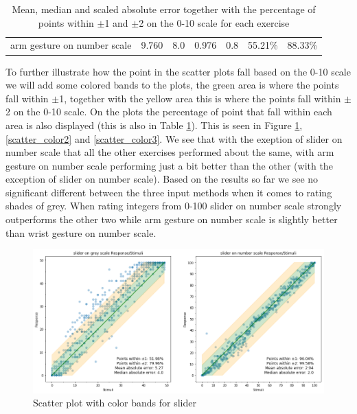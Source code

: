\begin{table}[p]
{\begin{tabular}{rcccccc}
\multicolumn{1}{r|}{arm gesture on number scale} & \multicolumn{1}{c|}{9.760} & \multicolumn{1}{c|}{8.0} & \multicolumn{1}{c|}{0.976} & \multicolumn{1}{c|}{0.8} & \multicolumn{1}{c|}{55.21\%} & \multicolumn{1}{c|}{88.33\%} \\ \cline{2-7} 
\end{tabular}%
}
\caption{Mean, median and scaled absolute error together with the percentage of points within $\pm$1 and $\pm$2 on the 0-10 scale for each exercise}
\label{abs_error}
\end{table}



To further illustrate how the point in the scatter plots fall based on the 0-10 scale we will add some colored bands to the plots, the green area is where the points fall within $\pm$1, together with the yellow area this is where the points fall within $\pm$2 on the 0-10 scale. On the plots the percentage of point that fall within each area is also displayed (this is also in Table \ref{abs_error}). This is seen in Figure \ref{scatter_color1}, \ref{scatter_color2} and \ref{scatter_color3}. We see that with the exeption of slider on number scale that all the other exercises performed about the same, with arm gesture on number scale performing just a bit better than the other (with the exception of slider on number scale). Based on the results so far we see no significant different between the three input methods when it comes to rating shades of grey. When rating integers from 0-100 slider on number scale strongly outperforms the other two while arm gesture on number scale is slightly better than wrist gesture on number scale.

\begin{figure}[p]
    \centering
    \includegraphics[width=1.15\textwidth]{figures/scatter_col1.png}
    \caption{Scatter plot with color bands for slider}
    \label{scatter_color1}
\end{figure}

